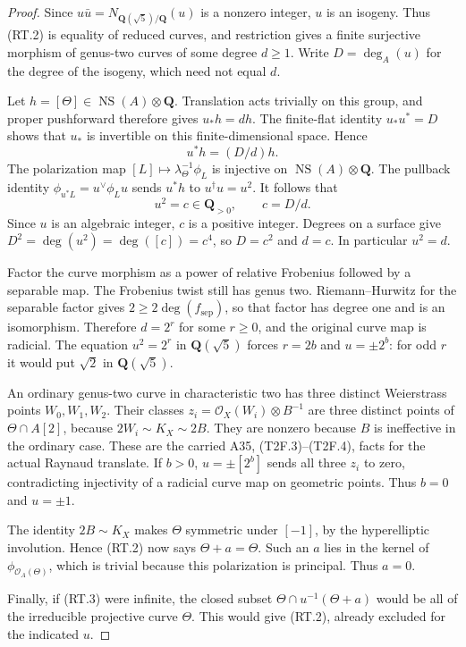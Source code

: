 \begin{proof}
Since $u\bar u=N_{\mathbf Q(\sqrt5)/\mathbf Q}(u)$ is a nonzero
integer, $u$ is an isogeny.  Thus (RT.2) is equality of reduced
curves, and restriction gives a finite surjective morphism of
genus-two curves of some degree $d\ge1$.  Write $D=\deg_A(u)$
for the degree of the isogeny, which need not equal $d$.

Let $h=[\Theta]\in\operatorname{NS}(A)\otimes\mathbf Q$.
Translation acts trivially on this group, and proper pushforward
therefore gives $u_*h=d h$.  The finite-flat identity
$u_*u^*=D$ shows that $u_*$ is invertible on this finite-dimensional
space.  Hence
\[
                       u^*h=(D/d)h.                          \tag{RT.4}
\]
The polarization map $[L]\mapsto\lambda_\Theta^{-1}\phi_L$
is injective on $\operatorname{NS}(A)\otimes\mathbf Q$.
The pullback identity
$\phi_{u^*L}=u^\vee\phi_Lu$ sends $u^*h$ to $u^\dagger u=u^2$.
It follows that
\[
                   u^2=c\in\mathbf Q_{>0},\qquad c=D/d.
                                                               \tag{RT.5}
\]
Since $u$ is an algebraic integer, $c$ is a positive integer.
Degrees on a surface give
$D^2=\deg(u^2)=\deg([c])=c^4$, so $D=c^2$ and $d=c$.
In particular $u^2=d$.

Factor the curve morphism as a power of relative Frobenius
followed by a separable map.  The Frobenius twist still has
genus two.  Riemann--Hurwitz for the separable factor gives
$2\ge2\deg(f_{\mathrm{sep}})$, so that factor has degree one
and is an isomorphism.  Therefore $d=2^r$ for some $r\ge0$,
and the original curve map is radicial.  The equation
$u^2=2^r$ in $\mathbf Q(\sqrt5)$ forces $r=2b$ and
$u=\pm2^b$: for odd $r$ it would put $\sqrt2$ in
$\mathbf Q(\sqrt5)$.

An ordinary genus-two curve in characteristic two has three
distinct Weierstrass points $W_0,W_1,W_2$.  Their classes
$z_i=\mathcal O_X(W_i)\otimes B^{-1}$ are three distinct
points of $\Theta\cap A[2]$, because $2W_i\sim K_X\sim2B$.
They are nonzero because $B$ is ineffective in the ordinary
case.  These are the carried A35, (T2F.3)--(T2F.4), facts for
the actual Raynaud translate.  If $b>0$, $u=\pm[2^b]$ sends
all three $z_i$ to zero, contradicting injectivity of a
radicial curve map on geometric points.  Thus $b=0$ and
$u=\pm1$.

The identity $2B\sim K_X$ makes $\Theta$ symmetric under
$[-1]$, by the hyperelliptic involution.  Hence (RT.2) now says
$\Theta+a=\Theta$.  Such an $a$ lies in the kernel of
$\phi_{\mathcal O_A(\Theta)}$, which is trivial because this
polarization is principal.  Thus $a=0$.

Finally, if (RT.3) were infinite, the closed subset
$\Theta\cap u^{-1}(\Theta+a)$ would be all of the irreducible
projective curve $\Theta$.  This would give (RT.2), already
excluded for the indicated $u$.
\end{proof}

